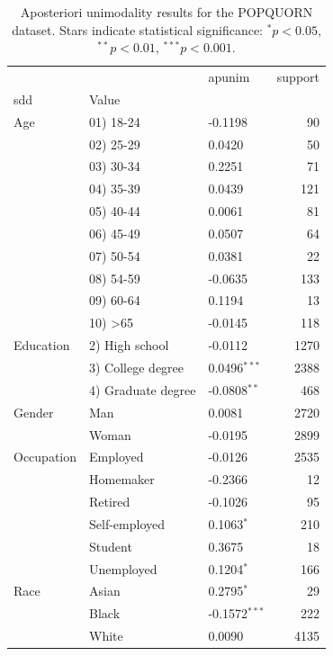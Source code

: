 \begin{table}[t]
\centering
\caption{Aposteriori unimodality results for the POPQUORN dataset. Stars indicate statistical significance: $^{*}p<0.05$, $^{**}p<0.01$, $^{***}p<0.001$.}
\label{tab:popquorn-results}
\begin{tabular}{lllr}
\toprule
 &  & apunim & support \\
\ac{sdd} & Value &  &  \\
\midrule
Age & 01) 18-24 & -0.1198 & 90 \\
 & 02) 25-29 & 0.0420 & 50 \\
 & 03) 30-34 & 0.2251 & 71 \\
 & 04) 35-39 & 0.0439 & 121 \\
 & 05) 40-44 & 0.0061 & 81 \\
 & 06) 45-49 & 0.0507 & 64 \\
 & 07) 50-54 & 0.0381 & 22 \\
 & 08) 54-59 & -0.0635 & 133 \\
 & 09) 60-64 & 0.1194 & 13 \\
 & 10) >65 & -0.0145 & 118 \\
Education & 2) High school & -0.0112 & 1270 \\
 & 3) College degree & 0.0496$^{***}$ & 2388 \\
 & 4) Graduate degree & -0.0808$^{**}$ & 468 \\
Gender & Man & 0.0081 & 2720 \\
 & Woman & -0.0195 & 2899 \\
Occupation & Employed & -0.0126 & 2535 \\
 & Homemaker & -0.2366 & 12 \\
 & Retired & -0.1026 & 95 \\
 & Self-employed & 0.1063$^{*}$ & 210 \\
 & Student & 0.3675 & 18 \\
 & Unemployed & 0.1204$^{*}$ & 166 \\
Race & Asian & 0.2795$^{*}$ & 29 \\
 & Black & -0.1572$^{***}$ & 222 \\
 & White & 0.0090 & 4135 \\
\bottomrule
\end{tabular}
\end{table}
